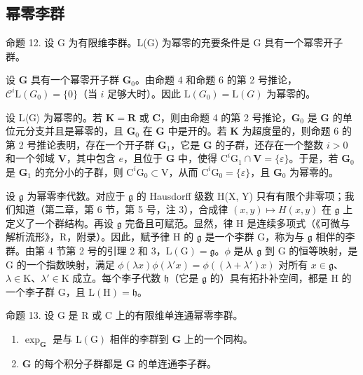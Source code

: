 \subsection{幂零李群}

命题 12. 设 G 为有限维李群。L(G) 为幂零的充要条件是 G 具有一个幂零开子群。

设 \(\mathbf{G}\) 具有一个幂零开子群 \(\mathbf{G}_0\)。由命题 4 和命题 6 的第 2 号推论，\(\mathcal{C}^i\mathrm{L}(G_0) = \{0\}\)（当 \(i\) 足够大时）。因此 \(\mathrm{L}(G_0) = \mathrm{L}(G)\) 为幂零的。

设 \(\mathrm{L}\langle \mathrm{G}\rangle\) 为幂零的。若 \(\mathbf{K} = \mathbf{R}\) 或 \(\mathbf{C}\)，则由命题 4 的第 2 号推论，\(\mathbf{G}_0\) 是 \(\mathbf{G}\) 的单位元分支并且是幂零的，且 \(\mathbf{G}_0\) 在 \(\mathbf{G}\) 中是开的。若 \(\mathbf{K}\) 为超度量的，则命题 6 的第 2 号推论表明，存在一个开子群 \(\mathbf{G}_1\)，它是 \(\mathbf{G}\) 的子群，还存在一个整数 \(i > 0\) 和一个邻域 \(\mathbf{V}\)，其中包含 \(e\)，且位于 \(\mathbf{G}\) 中，使得 \(\mathrm{C}^i\mathrm{G}_1\cap \mathbf{V} = \{\varepsilon \}\)。于是，若 \(\mathbf{G}_0\) 是 \(\mathbf{G}_1\) 的充分小的子群，则 \(\mathrm{C}^i\mathrm{G}_0\subset \mathrm{V}\)，从而 \(\mathrm{C}^i\mathrm{G}_0 = \{\varepsilon \}\)，且 \(\mathbf{G}_0\) 为幂零的。

设 \(\mathfrak{g}\) 为幂零李代数。对应于 \(\mathfrak{g}\) 的 Hausdorff 级数 H(X, Y) 只有有限个非零项；我们知道（第二章，第 6 节，第 5 号，注 3），合成律 \((x, y) \mapsto H(x, y)\) 在 \(\mathfrak{g}\) 上定义了一个群结构。再设 \(\mathfrak{g}\) 完备且可赋范。显然，律 H 是连续多项式（《可微与解析流形》，R，附录）。因此，赋予律 H 的 \(\mathfrak{g}\) 是一个李群 G，称为与 \(\mathfrak{g}\) 相伴的李群。由第 4 节第 2 号的引理 2 和 3，\(\mathrm{L}(\mathrm{G}) = \mathfrak{g}\)。\(\phi\) 是从 \(\mathfrak{g}\) 到 \(\mathrm{G}\) 的恒等映射，是 \(\mathrm{G}\) 的一个指数映射，满足 \(\phi(\lambda x)\phi(\lambda' x) = \phi((\lambda + \lambda') x)\) 对所有 \(x \in \mathfrak{g}\)、\(\lambda \in \mathrm{K}\)、\(\lambda' \in \mathrm{K}\) 成立。每个李子代数 \(\mathfrak{h}\)（它是 \(\mathfrak{g}\) 的）具有拓扑补空间，都是 \(\mathrm{H}\) 的一个李子群 \(\mathrm{G}\)，且 \(\mathrm{L}(\mathrm{H}) = \mathfrak{h}\)。

命题 13. 设 G 是 R 或 C 上的有限维单连通幂零李群。

\begin{enumerate}
\def\labelenumi{(\roman{enumi})}
\item
  \(\exp_{\mathbf{G}}\) 是与 \(\mathrm{L}(\mathrm{G})\) 相伴的李群到 \(\mathbf{G}\) 上的一个同构。
\item
  \(\mathbf{G}\) 的每个积分子群都是 \(\mathbf{G}\) 的单连通李子群。
\end{enumerate}

